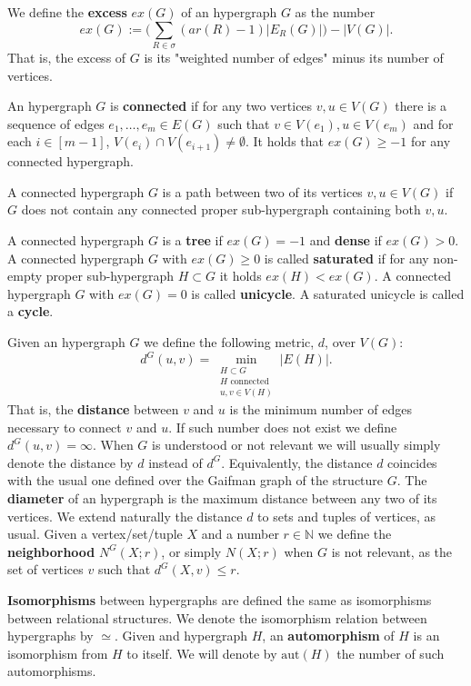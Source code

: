 \documentclass[12pt,notitlepage,a4paper]{article}
\theoremstyle{definition}
\newcommand{\N}{\mathbb{N}}
\newcommand{\aut}{\mathrm{aut}}
\begin{document}
We define the \textbf{excess} $ex(G)$ of an hypergraph $G$ as the number
\[
ex(G):= \big(\sum_{R\in \sigma} (ar(R)-1)|E_R(G)|\big) - |V(G)|.  
\] 
That is, the excess of $G$ is its "weighted number of edges"
minus its number of vertices. \par
An hypergraph $G$ is \textbf{connected} if for any two vertices $v,u\in V(G)$
there is a sequence of edges $e_1,\dots, e_m\in E(G)$ such that
$v\in V(e_1), u\in V(e_m)$ and for each $i\in [m-1]$, 
$V(e_i)\cap V(e_{i+1})\neq \emptyset$. It holds that
$ex(G)\geq -1$ for any connected hypergraph.
\par
A connected hypergraph $G$ is a path between two of its 
vertices $v,u\in V(G)$ if $G$ 
does not contain any connected proper sub-hypergraph containing both $v,u$.
\par
A connected hypergraph $G$ is a \textbf{tree} if $ex(G)=-1$ and \textbf{dense} if $ex(G)>0$.
A connected hypergraph $G$ with $ex(G)\geq 0$ is called \textbf{saturated} 
if for any non-empty proper sub-hypergraph
$H\subset G$ it holds $ex(H)<ex(G)$. 
A connected hypergraph $G$ with $ex(G)=0$ is called \textbf{unicycle}. 
A saturated unicycle is called a \textbf{cycle}. \par
Given an hypergraph $G$ we define the following metric, $d$, over $V(G)$:
\[ d^G(u,v)= \min_{\substack{H \subset G\\ 
		H \text{ connected }\\
		u,v\in V(H)}} |E(H)| .\]
That is, the \textbf{distance} between $v$ and $u$ is the minimum number of
edges necessary to connect $v$ and $u$. 
If such number does not exist we define $d^G(u,v)=\infty$. 
When $G$ 
is understood or not relevant we will usually simply denote the 
distance by $d$ instead of $d^G$. Equivalently, the distance $d$
coincides with the usual one defined over the Gaifman graph of the structure 
$G$. The \textbf{diameter} of an hypergraph is the maximum distance between any 
two of its vertices. 
We extend naturally the distance $d$ to sets and tuples of
vertices, as usual. Given a vertex/set/tuple $X$ and a number
$r\in \N$ we define the \textbf{neighborhood}
$N^G(X;r)$, or simply $N(X;r)$ when $G$ is not relevant,
as the set of vertices $v$ such that $d^G(X,v)\leq r$.
\par

\textbf{Isomorphisms} between hypergraphs are defined the same as 
isomorphisms between relational structures. We denote the isomorphism relation
between hypergraphs by $\simeq$. 
Given and hypergraph $H$, an \textbf{automorphism} of $H$
is an isomorphism from $H$ to itself. We will denote by
$\aut(H)$ the number of such automorphisms. \par
\end{document}
